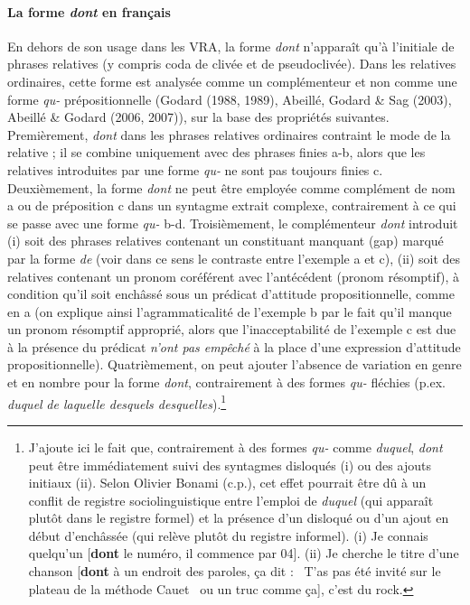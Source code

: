 \paragraph[La forme dont en français]{La forme \textit{dont} en français}
\label{bkm:Ref298795556}En dehors de son usage dans les VRA, la forme \textit{dont} n'apparaît qu'à l'initiale de phrases relatives (y compris coda de clivée et de pseudoclivée). Dans les relatives ordinaires, cette forme est analysée comme un complémenteur et non comme une forme \textit{qu-} prépositionnelle (Godard (1988, 1989), Abeillé, Godard \& Sag  (2003), Abeillé \& Godard (2006, 2007)), sur la base des propriétés suivantes. Premièrement, \textit{dont} dans les phrases relatives ordinaires contraint le mode de la relative ; il se combine uniquement avec des phrases finies a-b, alors que les relatives introduites par une forme \textit{qu-} ne sont pas toujours finies c. Deuxièmement, la forme \textit{dont} ne peut être employée comme complément de nom a ou de préposition c dans un syntagme extrait complexe, contrairement à ce qui se passe avec une forme \textit{qu-} b-d. Troisièmement, le complémenteur \textit{dont} introduit (i) soit des phrases relatives contenant un constituant manquant (gap) marqué par la forme \textit{de} (voir dans ce sens le contraste entre l'exemple a et c), (ii) soit des relatives contenant un pronom coréférent avec l'antécédent (pronom  résomptif), à condition qu'il soit enchâssé sous un prédicat d'attitude propositionnelle, comme en a (on explique ainsi l'agrammaticalité de l'exemple b par le fait qu'il manque un pronom résomptif approprié, alors que l'inacceptabilité de l'exemple c est due à la présence du prédicat \textit{n'ont pas empêché} à la place d'une expression d'attitude propositionnelle). Quatrièmement, on peut ajouter l'absence de variation en genre et en nombre pour la forme \textit{dont}, contrairement à des formes \textit{qu-} fléchies (p.ex. \textit{duquel} {\textbar} \textit{de laquelle {\textbar} desquels {\textbar} desquelles}).\footnote{J'ajoute ici le fait que, contrairement à des formes \textit{qu-} comme \textit{duquel}, \textit{dont} peut être immédiatement suivi des syntagmes disloqués (i) ou des ajouts initiaux (ii). Selon Olivier Bonami (c.p.), cet effet pourrait être dû à un conflit de registre sociolinguistique entre l'emploi de \textit{duquel} (qui apparaît plutôt dans le registre formel) et la présence d'un disloqué ou d'un ajout en début d'enchâssée (qui relève plutôt du registre informel).
(i)  Je connais quelqu'un [\textbf{dont} le numéro, il commence par 04].
(ii)  Je cherche le titre d'une chanson [\textbf{dont} à un endroit des paroles, ça dit : {\guillemotleft}~T'as pas été invité sur le plateau de la méthode Cauet~{\guillemotright} ou un truc comme ça], c'est du rock. } 


